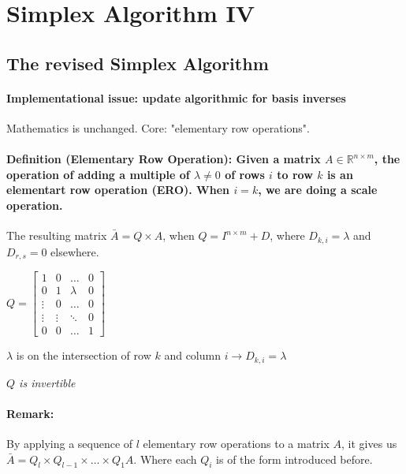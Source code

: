 \documentclass[main]{subfiles}
\begin{document}

\section{Simplex Algorithm IV}

\subsection{The revised Simplex Algorithm}

\paragraph{Implementational issue: update algorithmic for basis inverses}
Mathematics is unchanged. Core: "elementary row operations".

\paragraph{Definition (Elementary Row Operation): Given a matrix
$A \in \mathbb{R}^{n \times m}$, the operation of adding a multiple of
$\lambda \neq 0$ of rows $i$ to row $k$ is an elementart row operation (ERO).
When $i=k$, we are doing a scale operation.}
The resulting matrix $\bar{A} = Q \times A$, when $Q = I^{n\times m} + D$,
where $D_{k,i} = \lambda$ and $D_{r,s} = 0$ elsewhere.

$ Q =
\begin{bmatrix}
1 & 0 & \dots & 0 \\
0 & 1 & \lambda & 0 \\
\vdots & 0 & \dots & 0 \\
\vdots & \vdots & \ddots & 0 \\
0 & 0 & \dots & 1
\end{bmatrix}$

$\lambda$ is on the intersection of row $k$ and column
$i \rightarrow D_{k,i} = \lambda$

\emph{$Q$ is invertible}

\paragraph{Remark:}
By applying a sequence of $l$ elementary row operations to a matrix $A$, it
gives us $\bar{A} = Q_l \times Q_{l-1} \times \dots \times Q_1 A$. Where each
$Q_i$ is of the form introduced before.
\end{document}
